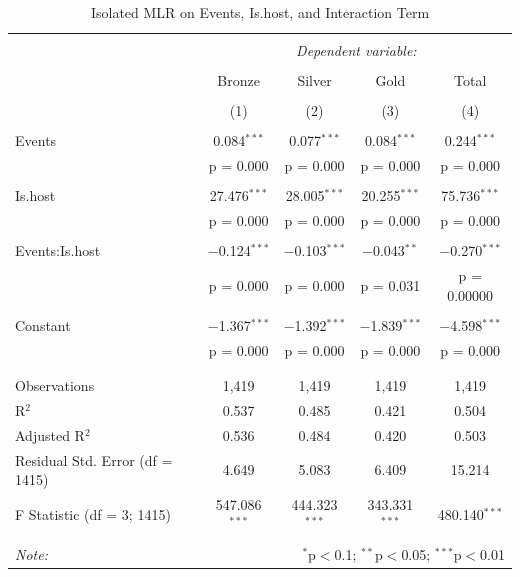 \documentclass{mcmthesis}
\begin{document}
\begin{longtable}{@{\extracolsep{5pt}}lcccc} 
  \caption{Isolated MLR on Events, Is.host, and Interaction Term}
  \label{} 
\\[-1.8ex]\hline 
\hline \\[-1.8ex] 
 & \multicolumn{4}{c}{\textit{Dependent variable:}} \\ 
\cline{2-5} 
\\[-1.8ex] & Bronze & Silver & Gold & Total \\ 
\\[-1.8ex] & (1) & (2) & (3) & (4)\\ 
\hline \\[-1.8ex] 
 Events & 0.084$^{***}$ & 0.077$^{***}$ & 0.084$^{***}$ & 0.244$^{***}$ \\ 
  & p = 0.000 & p = 0.000 & p = 0.000 & p = 0.000 \\ 
  & & & & \\ 
 Is.host & 27.476$^{***}$ & 28.005$^{***}$ & 20.255$^{***}$ & 75.736$^{***}$ \\ 
  & p = 0.000 & p = 0.000 & p = 0.000 & p = 0.000 \\ 
  & & & & \\ 
 Events:Is.host & $-$0.124$^{***}$ & $-$0.103$^{***}$ & $-$0.043$^{**}$ & $-$0.270$^{***}$ \\ 
  & p = 0.000 & p = 0.000 & p = 0.031 & p = 0.00000 \\ 
  & & & & \\ 
 Constant & $-$1.367$^{***}$ & $-$1.392$^{***}$ & $-$1.839$^{***}$ & $-$4.598$^{***}$ \\ 
  & p = 0.000 & p = 0.000 & p = 0.000 & p = 0.000 \\ 
  & & & & \\ 
\hline \\[-1.8ex] 
Observations & 1,419 & 1,419 & 1,419 & 1,419 \\ 
R$^{2}$ & 0.537 & 0.485 & 0.421 & 0.504 \\ 
Adjusted R$^{2}$ & 0.536 & 0.484 & 0.420 & 0.503 \\ 
Residual Std. Error (df = 1415) & 4.649 & 5.083 & 6.409 & 15.214 \\ 
F Statistic (df = 3; 1415) & 547.086$^{***}$ & 444.323$^{***}$ & 343.331$^{***}$ & 480.140$^{***}$ \\ 
\hline 
\hline \\[-1.8ex] 
\textit{Note:}  & \multicolumn{4}{r}{$^{*}$p$<$0.1; $^{**}$p$<$0.05; $^{***}$p$<$0.01} \\ 
\end{longtable} 
\end{document}
